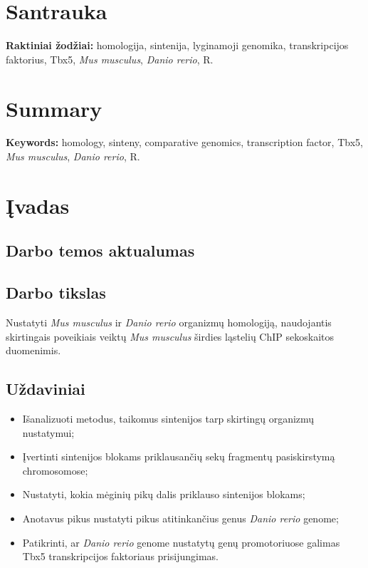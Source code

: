 \documentclass[12pt]{article}
\begin{document}
\section*{Santrauka}

\hfill \break
\textbf{Raktiniai žodžiai:} homologija, sintenija, lyginamoji genomika,
    transkripcijos faktorius, Tbx5, \emph{Mus musculus}, \emph{Danio rerio}, R.

\newpage


\section*{Summary}

\hfill \break
\textbf{Keywords:} homology, sinteny, comparative genomics,
    transcription factor, Tbx5, \emph{Mus musculus}, \emph{Danio rerio}, R.

\newpage


\section{Įvadas}
\subsection*{Darbo temos aktualumas}
\subsection*{Darbo tikslas}

Nustatyti \emph{Mus musculus} ir \emph{Danio rerio} organizmų homologiją,
naudojantis skirtingais poveikiais veiktų \emph{Mus musculus} širdies
ląstelių ChIP sekoskaitos duomenimis.

\subsection*{Uždaviniai}
\begin{itemize}
    \item Išanalizuoti metodus, taikomus sintenijos tarp skirtingų organizmų
    nustatymui;
    \item Įvertinti sintenijos blokams priklausančių sekų fragmentų
    pasiskirstymą chromosomose;
    \item Nustatyti, kokia mėginių pikų dalis priklauso sintenijos blokams;
    \item Anotavus pikus nustatyti pikus atitinkančius genus \emph{Danio rerio}
    genome;
    \item Patikrinti, ar \emph{Danio rerio} genome nustatytų genų promotoriuose
    galimas Tbx5 transkripcijos faktoriaus prisijungimas.
\end{itemize}
\end{document}
